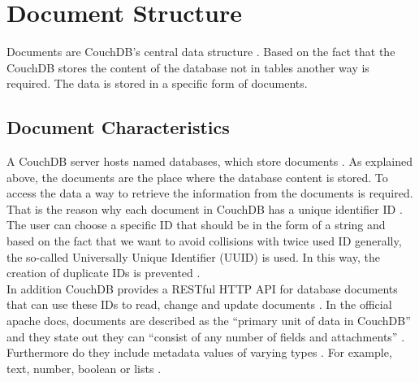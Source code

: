 \section{Document Structure}

Documents are CouchDB’s central data structure \cite{Tutorialspoint, CouchDB.Guide}. 
Based on the fact that the CouchDB stores the content of the database not in tables another way is required. The data is stored in a specific form of documents.


\subsection{Document Characteristics}
A CouchDB server hosts named databases, which store documents \cite{apache.docs.2.0}. As explained above, the documents are the place where the database content is stored. To access the data a way to retrieve the information from the documents is required. That is the reason why each document in CouchDB has a unique identifier ID \cite{Brown.2012, Tutorialspoint}. The user can choose a specific ID that should be in the form of a string and based on the fact that we want to avoid collisions with twice used ID generally, the so-called Universally Unique Identifier (UUID) is used. In this way, the creation of duplicate IDs is prevented \cite{Tutorialspoint}. \\
In addition CouchDB provides a RESTful HTTP API for database documents that can use these IDs to read, change and update documents \cite{apache.docs.2.0}.
In the official apache docs, documents are described as the ``primary unit of data in CouchDB''  and they state out they can ``consist of any number of fields and attachments'' \cite{apache.docs.2.0}. 
Furthermore do they include metadata values of varying types \cite{apache.docs.2.0}. For example, text, number, boolean or lists \cite{apache.docs.2.0}.
\newline


